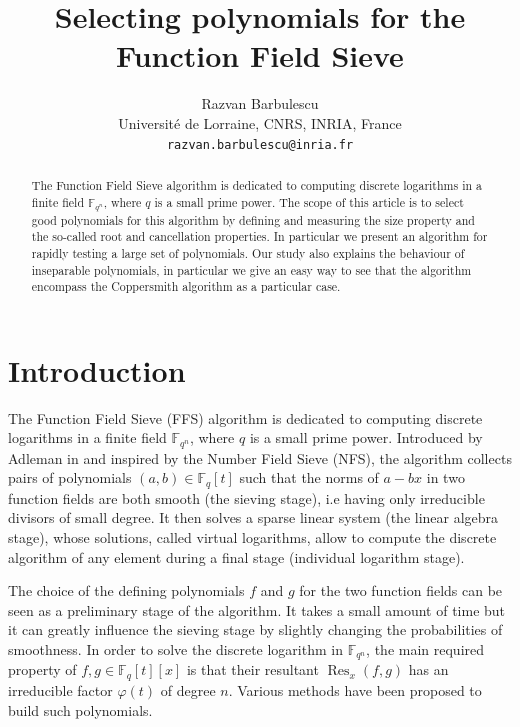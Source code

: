 \documentclass[a4wide]{article}
\title{Selecting polynomials for the\\ Function Field Sieve}
\date{}
\author{Razvan Barbulescu\\
	Université de Lorraine, CNRS, INRIA, France\\
\texttt{razvan.barbulescu@inria.fr}}
\newcommand{\F}{{\mathbb F}}
\DeclareMathOperator{\Res}{Res}
\theoremstyle{plain}
\theoremstyle{definition}
\theoremstyle{remark}
\begin{document}
\maketitle
\begin{abstract}
The Function Field Sieve algorithm is dedicated to computing discrete
logarithms in a finite field $\F_{q^n}$, where $q$
is a small prime power.  The scope of this
article is to select good polynomials for this algorithm by defining and
measuring the size property and the so-called root and cancellation
properties. In particular we present an algorithm for rapidly testing a
large set of polynomials. Our study also explains the behaviour of inseparable
polynomials, in particular we give an easy way to see that the algorithm
encompass the Coppersmith algorithm as a particular case.  
\end{abstract}


\section{Introduction}


The Function Field Sieve (FFS) algorithm is dedicated to computing discrete
logarithms in a finite field $\F_{q^n}$, where $q$
is a small prime power. Introduced by Adleman in
\cite{Ad94} and inspired by the Number Field Sieve (NFS), the algorithm collects
pairs of polynomials $(a,b)\in\F_q[t]$ such that the norms of $a-bx$ in two function fields are
both smooth (the sieving stage), i.e having only irreducible divisors of
small degree. It
then solves a sparse linear system (the linear algebra stage), whose solutions, called virtual
logarithms,  allow to compute the
discrete algorithm of any element during a final stage (individual
logarithm stage).  

The choice of the defining polynomials $f$ and $g$ for the two function fields can be seen
as a preliminary stage of the algorithm. It takes a small amount of time
but it can greatly influence the sieving stage by slightly changing the
probabilities of smoothness.
In order to solve the discrete logarithm in $\F_{q^n}$, the main required
property of $f,g\in\F_q[t][x]$ is that their resultant $\Res_x(f,g)$ has
an irreducible factor $\varphi(t)$ of degree $n$. Various methods have
been proposed to build such polynomials.
\end{document}
